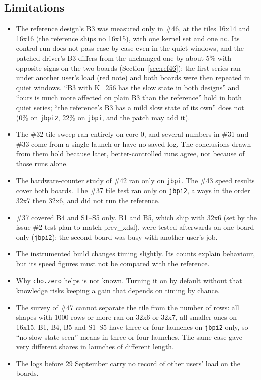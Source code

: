 \documentclass[11pt,a4paper]{article}
\begin{document}
\subsection{Limitations}
\begin{itemize}
  \item The reference design's B3 was measured only in \#46, at the tiles 16x14 and 16x16 (the reference ships no
  16x15), with one kernel set and one \texttt{nc}. Its control run does not pass case by case even in the quiet windows, and the patched driver's B3 differs from the unchanged one by
  about 5\% with opposite signs on the two boards (Section~\ref{sec:ref46}); the first series ran under another user's load (red note) and both boards were then
  repeated in quiet windows. ``B3 with K=256 has the slow state in both designs'' and ``ours is much more affected on plain B3 than the reference'' hold in both
  quiet series; ``the reference's B3 has a mild slow state of its own'' does not (0\% on \texttt{jbpi2}, 22\% on \texttt{jbpi}, and the patch may add it).
  \item The \#32 tile sweep ran entirely on core 0, and several numbers in \#31 and \#33 come from a single launch
  or have no saved log. The conclusions drawn from them hold because later, better-controlled runs agree, not
  because of those runs alone.
  \item The hardware-counter study of \#42 ran only on \texttt{jbpi}. The \#43 speed results cover both boards.
  The \#37 tile test ran only on \texttt{jbpi2}, always in the order 32x7 then 32x6, and did not run the
  reference.
  \item \#37 covered B4 and S1--S5 only. B1 and B5, which ship with 32x6 (set by the issue \#2 test plan to
  match prev\_xdsl), were tested afterwards on one board only (\texttt{jbpi2}); the second board was busy with
  another user's job.
  \item The instrumented build changes timing slightly. Its counts explain behaviour, but its speed figures must
  not be compared with the reference.
  \item Why \texttt{cbo.zero} helps is not known. Turning it on by default without that knowledge risks keeping a
  gain that depends on timing by chance.
  \item The survey of \#47 cannot separate the tile from the number of rows: all shapes with 1000 rows or more ran on
  32x6 or 32x7, all smaller ones on 16x15. B1, B4, B5 and S1--S5 have three or four launches on \texttt{jbpi2} only, so ``no slow state
  seen'' means in three or four launches. The same case gave very different shares in launches of different length.
  \item The logs before 29 September carry no record of other users' load on the boards.
\end{itemize}
\end{document}
